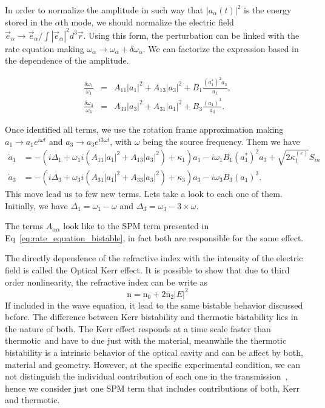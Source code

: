 In order to normalize the amplitude in such way that $|a_\alpha(t)|^2$ is the energy stored in the $\alpha$th mode, we should normalize the electric field $\vec{e}_\alpha \rightarrow\vec{e}_\alpha/\int|\vec{e}_\alpha|^2 d^3\vec{r}$. Using this form, the perturbation can be linked with the rate equation making $\omega_\alpha \rightarrow \omega_\alpha + \delta\omega_\alpha$. We can factorize the expression based in the dependence of the amplitude. 

\begin{eqnarray}
\frac{\delta\omega_1}{\omega_1} &=& A_{11}|a_1|^2 + A_{13}|a_3|^2 + B_1\frac{(a^*_1)^2a_3}{a_1},\label{eq:ir_per}\\
\frac{\delta\omega_3}{\omega_3} &=& A_{33}|a_3|^2 + A_{31}|a_1|^2 + B_3\frac{(a_1)^3}{a_3}\label{eq:vis_per}.
\end{eqnarray}

Once identified all terms, we use the rotation frame approximation making $a_1 \rightarrow a_1e^{i\omega t}$ and $a_3 \rightarrow a_3e^{i3\omega t}$, with $\omega$ being the source frequency. Them we have 
\begin{subequations}
    \begin{alignat}{1}
        \dot{a}_1 &= -\left(i\Delta_1 + \omega_1i(A_{11} |a_1|^2 + A_{13} |a_3|^2) + \kappa_{1}\right)a_1 - i\omega_1 B_1(a^*_1)^2a_3 
        +\sqrt{2 \kappa^{(e)}_1}S_{in}
        \label{eq:taxa_ir_broad}\\
        \dot{a}_3 &= -\left(i\Delta_3 + \omega_3i(A_{31} |a_1|^2 + A_{33} |a_3|^2) + \kappa_{3}\right)a_3 - i\omega_3 B_3(a_1)^3.
        \label{eq:taxa_vis_broad}
    \end{alignat}
    \label{eq:rate_broad}
\end{subequations}
This move lead us to few new terms. Lets take a look to each one of them. Initially, we have $\Delta_1 = \omega_1 - \omega$ and $\Delta_3 = \omega_3 - 3\times\omega$. 

The terms $A_{\alpha\alpha}$ look like to the SPM term presented in Eq~\ref{eq:rate_equation_bistable}, in fact both are responsible for the same effect. 

The directly dependence of the refractive index with the intensity of the electric field is called the Optical Kerr effect. It is possible to show that due to third order nonlinearity, the refractive index can be write as~\needcit
\begin{equation}
    \text{n} = \text{n}_0 + 2\bar{\text{n}}_2|E|^2 
\end{equation}
If included in the wave equation, it lead to the same bistable behavior discussed before. The difference between Kerr bistability and thermotic bistability lies in the nature of both. The Kerr effect responds at a time scale faster than thermotic~\needcit and have to due just with the material, meanwhile the thermotic bistability is a intrinsic behavior of the optical cavity and can be affect by both, material and geometry. However, at the specific experimental condition, we can not distinguish the individual contribution of each one in the transmission~\needcit, hence we consider just one SPM term that includes contributions of both, Kerr and thermotic. 

